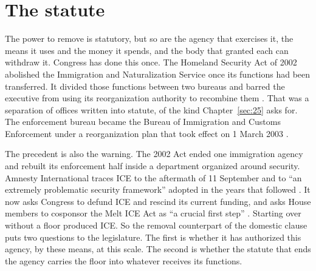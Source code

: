 \section{The statute}
\label{sec:10.4}
The power to remove is statutory, but so are the agency that exercises it, the means it uses and the money it spends, and the body that granted each can withdraw it. Congress has done this once. The Homeland Security Act of 2002 abolished the Immigration and Naturalization Service once its functions had been transferred. It divided those functions between two bureaus and barred the executive from using its reorganization authority to recombine them \autocite[§§442, 451, 471]{hsa2002}. That was a separation of offices written into statute, of the kind Chapter~\ref{sec:25} asks for. The enforcement bureau became the Bureau of Immigration and Customs Enforcement under a reorganization plan that took effect on 1 March 2003 \autocite{hdoc108_32}.

The precedent is also the warning. The 2002 Act ended one immigration agency and rebuilt its enforcement half inside a department organized around security. Amnesty International traces ICE to the aftermath of 11 September and to “an extremely problematic security framework” adopted in the years that followed \autocite{Amnesty2026PressRelease}. It now asks Congress to defund ICE and rescind its current funding, and asks House members to cosponsor the Melt ICE Act as “a crucial first step” \autocite{AmnestyUSA2026Letter}. Starting over without a floor produced ICE. So the removal counterpart of the domestic clause puts two questions to the legislature. The first is whether it has authorized this agency, by these means, at this scale. The second is whether the statute that ends the agency carries the floor into whatever receives its functions.
